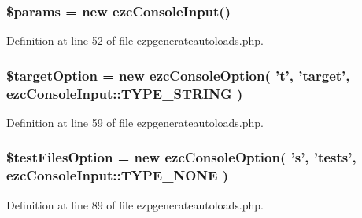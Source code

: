 \hypertarget{ezpgenerateautoloads_8php_afe68e6fbe7acfbffc0af0c84a1996466}{
\subsubsection[{\$params}]{\setlength{\rightskip}{0pt plus 5cm}\$params = new ezc\-Console\-Input()}}\label{ezpgenerateautoloads_8php_afe68e6fbe7acfbffc0af0c84a1996466}


Definition at line 52 of file ezpgenerateautoloads.\-php.

\hypertarget{ezpgenerateautoloads_8php_a6b7b596c6eccab7f3c39bbcad2d711a0}{
\subsubsection[{\$target\-Option}]{\setlength{\rightskip}{0pt plus 5cm}\$target\-Option = new ezc\-Console\-Option( 't', 'target', ezc\-Console\-Input\-::\-T\-Y\-P\-E\-\_\-\-S\-T\-R\-I\-N\-G )}}\label{ezpgenerateautoloads_8php_a6b7b596c6eccab7f3c39bbcad2d711a0}


Definition at line 59 of file ezpgenerateautoloads.\-php.

\hypertarget{ezpgenerateautoloads_8php_a42bc54b597a301809a0bdbec1c8f1ee6}{
\subsubsection[{\$test\-Files\-Option}]{\setlength{\rightskip}{0pt plus 5cm}\$test\-Files\-Option = new ezc\-Console\-Option( 's', 'tests', ezc\-Console\-Input\-::\-T\-Y\-P\-E\-\_\-\-N\-O\-N\-E )}}\label{ezpgenerateautoloads_8php_a42bc54b597a301809a0bdbec1c8f1ee6}


Definition at line 89 of file ezpgenerateautoloads.\-php.

